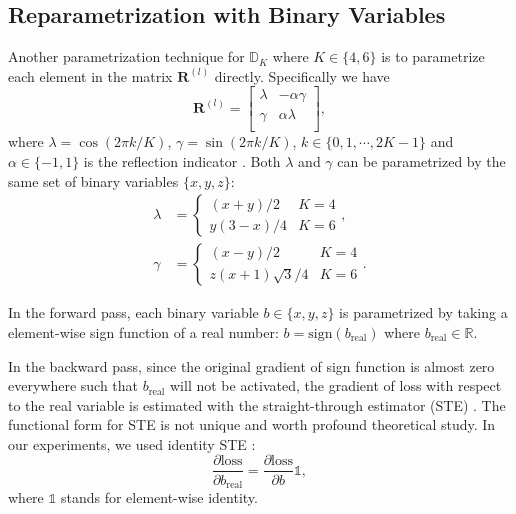 \documentclass[11pt,a4paper]{article}
\begin{document}
\subsection{Reparametrization with Binary Variables}
 Another parametrization technique for $\mathbb{D}_K$ where $K \in \{4, 6\}$ is to parametrize each element in the matrix $\bm{R}^{(l)}$ directly. Specifically we have 
\begin{equation*}
    \bm{R}^{(l)} = \left[
    \begin{array}{cc}
    \lambda & -\alpha \gamma \\
    \gamma & \alpha \lambda \\
    \end{array}\right],
\end{equation*}
where $\lambda = \cos(2\pi k /K)$, $\gamma = \sin(2\pi k /K)$, $k\in \{0,1,\cdots,2K-1\}$ and $\alpha \in \{-1, 1\}$ is the reflection indicator . Both $\lambda$ and $\gamma$ can be parametrized by the same set of binary variables $\{x, y, z\}$:
\begin{align*}
\lambda	& =\begin{cases}
(x+y)/2 & K=4 \\
    y(3-x)/4 & K=6
\end{cases}, \\
\gamma & =\begin{cases}
(x-y)/2 & K=4 \\
    z(x+1)\sqrt{3} /4 & K=6
\end{cases}.
\end{align*}


In the forward pass, each binary variable $b\in\{x,y,z\}$ is parametrized by taking a element-wise sign function of a real number: $b = \mathrm{sign}(b_{\mathrm{real}})$ where $b_{\mathrm{real}} \in \mathbb{R}$. 

In the backward pass,  since the original gradient of sign function is almost zero everywhere such that $b_{\mathrm{real}}$ will not be activated, the gradient of  loss with respect to the real variable is estimated with the straight-through estimator (STE)  \cite{ste}. The functional form for STE is not unique and worth profound theoretical study. In our experiments, we used identity STE \cite{hinton_STE}:
\begin{equation*}
    \frac{\partial \mathrm{loss}}{\partial b_{\mathrm{real}}} = \frac{\partial \mathrm{loss}}{\partial b} \mathds{1},
\end{equation*}
where $\mathds{1}$ stands for element-wise identity. 
\end{document}

